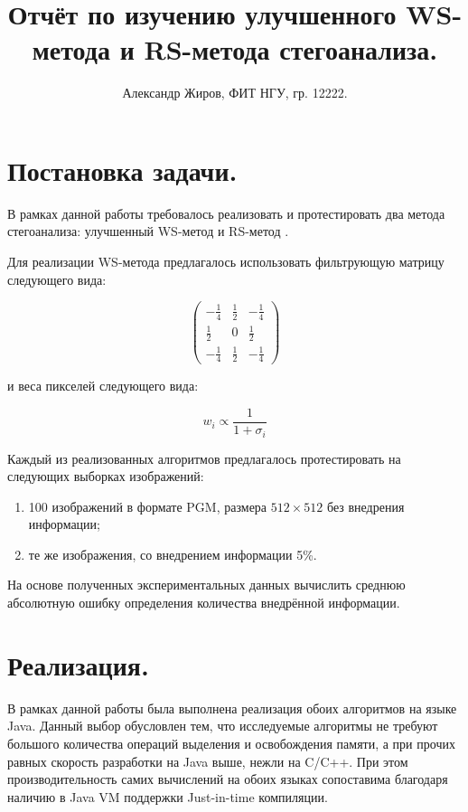 \documentclass[12pt,a4paper,russian,numbers=endperiod]{scrartcl}
\author{Александр Жиров, ФИТ НГУ, гр. 12222.}
\title{Отчёт по изучению улучшенного WS-метода и RS-метода стегоанализа.}
\begin{document}
\maketitle



\section{Постановка задачи.}

В рамках данной работы требовалось реализовать и протестировать два метода стегоанализа: улучшенный WS-метод \cite{ker} и RS-метод \cite{fridrich}.

Для реализации WS-метода предлагалось использовать фильтрующую матрицу следующего вида:

\begin{equation*}
\begin{pmatrix}
-\frac{1}{4}	& \frac{1}{2}	& -\frac{1}{4}\\
\frac{1}{2}		& 0				& \frac{1}{2}\\
-\frac{1}{4}	& \frac{1}{2}	& -\frac{1}{4}
\end{pmatrix}
\end{equation*}

\noindent и веса пикселей следующего вида:

\begin{equation*}
w_i \propto \frac{1}{1+\sigma{}_i}
\end{equation*}

Каждый из реализованных алгоритмов предлагалось протестировать на следующих выборках изображений:

\begin{enumerate}
	\item 100 изображений в формате PGM, размера $512\times{}512$ без внедрения информации;
	\item те же изображения, со внедрением информации 5\%.
\end{enumerate}

На основе полученных экспериментальных данных вычислить среднюю абсолютную ошибку определения количества внедрённой информации.

\section{Реализация.}

В рамках данной работы была выполнена реализация обоих алгоритмов на языке Java. Данный  выбор обусловлен тем, что исследуемые алгоритмы не требуют большого количества операций выделения и освобождения памяти, а при прочих равных скорость разработки на Java выше, нежли на C/C++. При этом производительность самих вычислений на обоих языках сопоставима благодаря наличию в Java VM поддержки Just-in-time компиляции.
\end{document}
